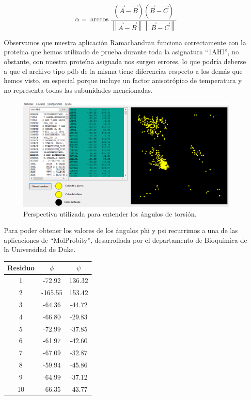 \documentclass[12pt]{article}
\begin{document}
\begin{equation}
\alpha=\arccos\frac{(\overrightarrow{A}-\overrightarrow{B})  (\overrightarrow{B}-\overrightarrow{C})}{\left\| \overrightarrow{A}-\overrightarrow{B} \right\| \left\|  \overrightarrow{B} - \overrightarrow{C} \right\|}  
\end{equation}

Observamos que nuestra aplicación Ramachandran funciona correctamente con la proteína que hemos utilizado de prueba durante toda la asignatura ``1AHI'', no obstante, con nuestra proteína asignada nos surgen errores, lo que podría deberse a que el archivo tipo pdb de la misma tiene diferencias respecto a los demás que hemos visto, en especial porque incluye un factor anisotrópico de temperatura y no representa todas las subunidades mencionadas.

\begin{figure}[H]
\centering
\includegraphics[scale=0.5]{Screenshot_47}
\caption{Perspectiva utilizada para entender los ángulos de torsión.}
\end{figure}

Para poder obtener los valores de los ángulos phi y psi recurrimos a una de las aplicaciones de ``MolProbity'', desarrollada por el departamento de Bioquímica de la Universidad de Duke.
\newline

\begin{center}
\begin{tabular}{| c | c | c |}
\hline
Residuo & $\phi$ & $\psi$ \\ \hline
1 &   -72.92  &  136.32  \\
2 &  -165.55  &  153.42  \\
3 &   -64.36  &  -44.72  \\
4 &   -66.80  &  -29.83  \\
5 &   -72.99  &  -37.85  \\
6 &   -61.97  &  -42.60  \\
7 &   -67.09  &  -32.87  \\
8 &   -59.94  &  -45.86  \\
9 &   -64.99  &  -37.12  \\
10 &  -66.35  &  -43.77  \\ \hline
\end{tabular}
\end{center}
\end{document}
